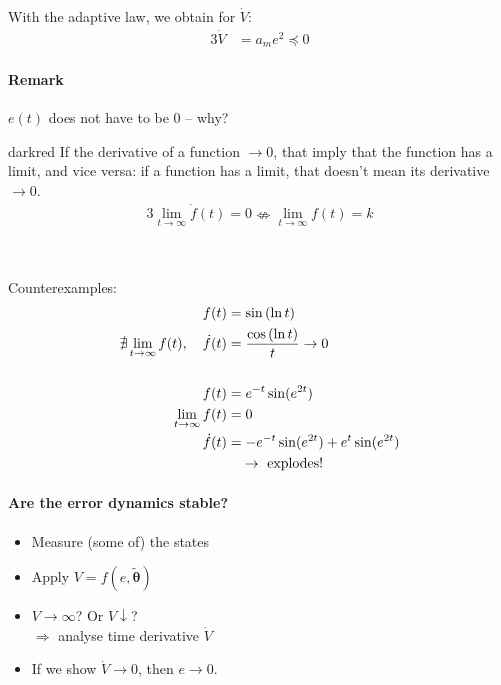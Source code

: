 With the adaptive law, we obtain for $\dot{V}$:
\begin{alignat}{3}
\dot{V} &= a_m e^2 \preceq 0 \label{eq:Vdot}
\end{alignat}

\paragraph{Remark}
$e(t)$ does not have to be 0 -- why?

\begin{conclusion}{darkred}
If the derivative of a function $\rightarrow 0$,
that  imply that the function
has a limit, and vice versa:
if a function has a limit, that doesn't mean its
derivative $\rightarrow 0$.
\begin{alignat*}{3}
\lim_{t \rightarrow \infty} \dot{f}(t) = 0
    \nLeftrightarrow \lim_{t \rightarrow \infty} f(t) = k
\end{alignat*}
\end{conclusion}~

Counterexamples:
\begin{align*}
f(t) &= \sin \left( \ln t \right)\\
\nexists \lim_{t \rightarrow \infty} f(t), \quad
\dot{f}(t) &= \frac{\cos \left( \ln t \right)}{t} \rightarrow 0\\
~\\
f(t) &= e^{-t} \sin (e^{2t})\\
 \lim_{t \rightarrow \infty} f(t) &= 0\\
\dot{f}(t) &= -e^{-t}\sin(e^{2t}) + e^t \sin(e^{2t}) \\
    & \quad \rightarrow    \textnormal{ explodes!}
\end{align*}

\paragraph{Are the error dynamics stable?}
\begin{itemize}
\item Measure (some of) the states
\item Apply $V = f(e, \tilde{\bm{\theta}})$
\item $V \rightarrow \infty$? Or $V \downarrow$?\\
    $\Rightarrow$ analyse time derivative $\dot{V}$
\item If we show $\dot{V} \rightarrow 0$, then $e \rightarrow 0$.
\end{itemize}

